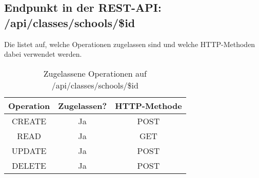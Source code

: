 \subsection{Endpunkt in der REST-API: /api/classes/schools/\$id}
Die  listet auf, welche Operationen zugelassen sind und welche HTTP-Methoden dabei verwendet werden. 

\begin{table}[!htbp]
	\begin{tabular}{|c|c|c|}
		\hline
			\textbf{Operation} & \textbf{Zugelassen?} & \textbf{HTTP-Methode} \\ \hline
			CREATE & Ja & POST \\ \hline 
			READ & Ja & GET \\ \hline
			UPDATE & Ja & POST \\ \hline 
			DELETE & Ja & POST \\ \hline
	\end{tabular}

		\caption{Zugelassene Operationen auf /api/classes/schools/\$id}
		\label{tab:end:rest:api:classes:schools:id:meth}
\end{table}